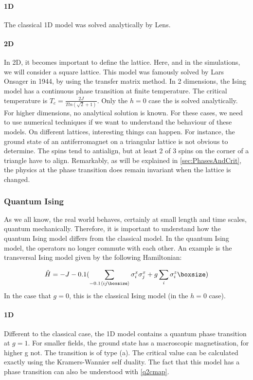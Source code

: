 \paragraph{1D}

The classical 1D model was solved analytically by Lens. 

\paragraph{2D}

In 2D, it becomes important to define the lattice. Here, and in the simulations, we will consider a square lattice. This model was famously solved by Lars Onsager in 1944, by using the transfer matrix method. In 2 dimensions, the Ising model has a continuous phase transition at finite temperature. The critical temperature is $T_c = \frac{2 J}{T ln( \sqrt{2}+1)}$. Only the $h=0$ case the is solved analytically. For higher dimensions, no analytical solution is known. For these cases, we need to use numerical techniques if we want to understand the behaviour of these models. On different lattices, interesting things can happen. For instance, the ground state of an antiferromagnet on a triangular lattice is not obvious to determine. The spins tend to antialign, but at least 2 of 3 spins on the corner of a triangle have to align. Remarkably, as will be explained in \cref{sec:PhasesAndCrit}, the physics at the phase transition does remain invariant when the lattice is changed. 

\subsubsection{Quantum Ising}

As we all know, the real world behaves, certainly at small length and time scales, quantum mechanically. Therefore, it is important to understand how the quantum Ising model differs from the classical model. In the quantum Ising model, the operators no longer commute with each other. An example is the transversal Ising model given by the following Hamiltonian:

\begin{equation}
    \hat{H} = -J \left (  \sum_{\Braket{i j }} \sigma^x_i \sigma^x_j + g \sum_i \sigma^z_i \right )
\end{equation}
In the case that $g=0$, this is the classical Ising model (in the $h=0$ case).

\paragraph{1D}
Different to the classical case, the 1D model contains a quantum phase transition at $g=1$. For smaller fields, the ground state has a macroscopic magnetisation, for higher g not. The transition is of type  (a). The critical value can be calculated exactly using the Kramers-Wannier self duality.  The fact that this model has a phase transition can also be understood with \cref{q2cmap}.

